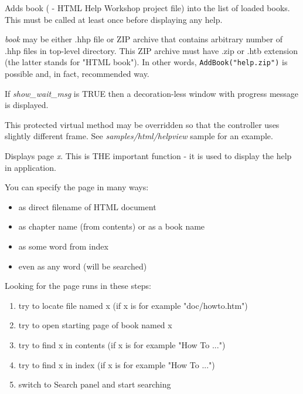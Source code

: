 
Adds book ( - HTML Help Workshop project file) into the list of loaded books.
This must be called at least once before displaying  any help.

{\it book} may be either .hhp file or ZIP archive that contains arbitrary number of .hhp files in 
top-level directory. This ZIP archive must have .zip or .htb extension
(the latter stands for "HTML book"). In other words, {\tt AddBook("help.zip")} is possible and, in fact,
recommended way.

If {\it show\_wait\_msg} is TRUE then a decoration-less window with progress message is displayed.

\label{wxhtmlhelpcontrollercreatehelpframe}


This protected virtual method may be overridden so that the controller
uses slightly different frame. See {\it samples/html/helpview} sample for
an example.
\label{wxhtmlhelpcontrollerdisplay}


Displays page {\it x}. This is THE important function - it is used to display
the help in application.

You can specify the page in many ways:

\begin{itemize}\itemsep=0pt
\item as direct filename of HTML document
\item as chapter name (from contents) or as a book name
\item as some word from index
\item even as any word (will be searched)
\end{itemize}

Looking for the page runs in these steps:

\begin{enumerate}\itemsep=0pt
\item try to locate file named x (if x is for example "doc/howto.htm")
\item try to open starting page of book named x
\item try to find x in contents (if x is for example "How To ...")
\item try to find x in index (if x is for example "How To ...")
\item switch to Search panel and start searching
\end{enumerate}

